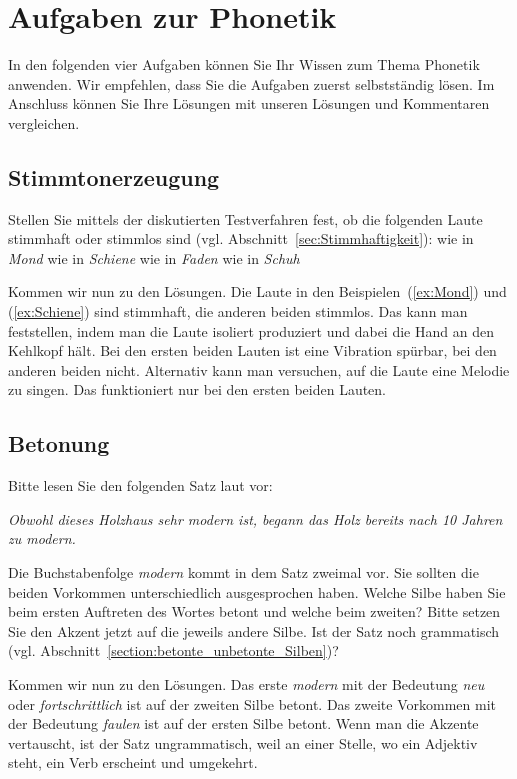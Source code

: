 \section{Aufgaben zur Phonetik}
In den folgenden vier Aufgaben können Sie Ihr Wissen zum Thema Phonetik anwenden. Wir empfehlen, dass Sie die Aufgaben zuerst selbstständig lösen. Im Anschluss können Sie Ihre Lösungen mit unseren Lösungen und Kommentaren vergleichen.

\subsection{Stimmtonerzeugung}

Stellen Sie mittels der diskutierten Testverfahren fest, ob die folgenden Laute stimmhaft oder stimmlos sind (vgl. Abschnitt~\ref{sec:Stimmhaftigkeit}):
\ea
\ea \label{ex:Mond} \textipa{[m]} wie in \textit{Mond}
\ex \label{ex:Schiene} \textipa{[i:]} wie in \textit{Schiene}
\ex \label{ex:Faden} \textipa{[f]} wie in \textit{Faden}
\ex \label{ex:Schuh} \textipa{[S]} wie in \textit{Schuh}
\z 
\z

Kommen wir nun zu den Lösungen. Die Laute in den Beispielen~(\ref{ex:Mond}) und (\ref{ex:Schiene}) sind stimmhaft, die anderen beiden stimmlos. Das kann man feststellen, indem man die Laute isoliert produziert und dabei die Hand an den Kehlkopf hält. Bei den ersten beiden Lauten ist eine Vibration spürbar, bei den anderen beiden nicht. Alternativ kann man versuchen, auf die Laute eine Melodie zu singen. Das funktioniert nur bei den ersten beiden Lauten.


\subsection{Betonung}\label{subsection:Betonung}

Bitte lesen Sie den folgenden Satz laut vor: 

\ea \textit{Obwohl dieses Holzhaus sehr modern ist, begann das Holz bereits nach 10 Jahren zu modern.} 
\z

Die Buchstabenfolge \textit{modern} kommt in dem Satz zweimal vor. Sie sollten die beiden Vorkommen unterschiedlich ausgesprochen haben. Welche Silbe haben Sie beim ersten Auftreten des Wortes betont und welche beim zweiten? Bitte setzen Sie den Akzent jetzt auf die jeweils andere Silbe. Ist der Satz noch grammatisch (vgl. Abschnitt~\ref{section:betonte_unbetonte_Silben})?

Kommen wir nun zu den Lösungen. Das erste \textit{modern} mit der Bedeutung \textit{neu} oder \textit{fortschrittlich} ist auf der zweiten Silbe betont. Das zweite Vorkommen mit der Bedeutung \textit{faulen} ist auf der ersten Silbe betont. Wenn man die Akzente vertauscht, ist der Satz ungrammatisch, weil an einer Stelle, wo ein Adjektiv steht, ein Verb erscheint und umgekehrt.

